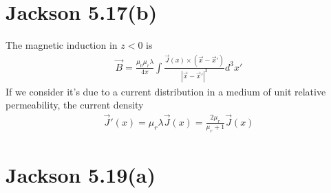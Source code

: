 \documentclass{article}
\begin{document}
\section*{Jackson 5.17(b)}

The magnetic induction in $z<0$ is
\begin{align*}
  \vec B=\frac{\mu_0\mu_r\lambda}{4\pi}\int\frac{\vec J(x)\times(\vec x-\vec x')}{|\vec x-\vec x'|^3}d^3x'
\end{align*}
If we consider it's due to a current distribution in a medium of unit relative permeability, the current density
\begin{align*}
  \vec J'(x)=\mu_r\lambda \vec J(x)=\frac{2\mu_r}{\mu_r+1}\vec J(x)
\end{align*}
\pagebreak
\section*{Jackson 5.19(a)}
\end{document}
